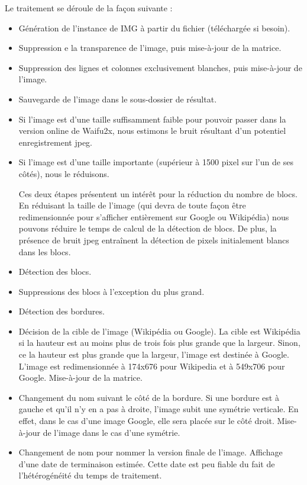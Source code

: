 \documentclass[a4paper,12pt]{article}
\begin{document}
Le traitement se déroule de la façon suivante :
\begin{itemize}
\item Génération de l'instance de IMG à partir du fichier (téléchargée si besoin).
\item Suppression e la transparence de l'image, puis mise-à-jour de la matrice.
\item Suppression des lignes et colonnes exclusivement blanches, puis mise-à-jour de l'image.
\item Sauvegarde de l'image dans le sous-dossier de résultat.
\item Si l'image est d'une taille suffisamment faible pour pouvoir passer dans la version online de Waifu2x, nous estimons le bruit résultant d'un potentiel enregistrement jpeg.
\item Si l'image est d'une taille importante (supérieur à 1500 pixel sur l'un de ses côtés), nous le réduisons.

Ces deux étapes présentent un intérêt pour la réduction du nombre de blocs. En réduisant la taille de l'image (qui devra de toute façon être redimensionnée pour s'afficher entièrement sur Google ou Wikipédia) nous pouvons réduire le temps de calcul de la détection de blocs. De plus, la présence de bruit jpeg entraînent la détection de pixels initialement blancs dans les blocs.
\item Détection des blocs.
\item Suppressions des blocs à l'exception du plus grand.
\item Détection des bordures.
\item Décision de la cible de l'image (Wikipédia ou Google). La cible est Wikipédia si la hauteur est au moins plus de trois fois plus grande que la largeur. Sinon, ce la hauteur est plus grande que la largeur, l'image est destinée à Google. L'image est redimensionnée à 174x676 pour Wikipedia et à 549x706 pour Google. Mise-à-jour de la matrice.
\item Changement du nom suivant le côté de la bordure. Si une bordure est à gauche et qu'il n'y en a pas à droite, l'image subit une symétrie verticale. En effet, dans le cas d'une image Google, elle sera placée sur le côté droit. Mise-à-jour de l'image dans le cas d'une symétrie.
\item Changement de nom pour nommer la version finale de l'image. Affichage d'une date de terminaison estimée. Cette date est peu fiable du fait de l'hétérogénéité du temps de traitement.
\end{itemize}
\end{document}
